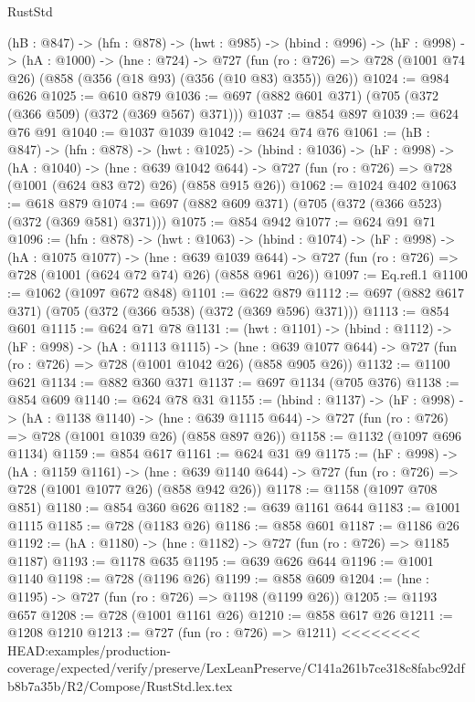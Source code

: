 \begin{lexlean}{RustStd}
\begin{coremodule}
{\begin{coremodule}
  (hB : @847) ->
  (hfn : @878) ->
  (hwt : @985) ->
  (hbind : @996) ->
  (hF : @998) ->
  (hA : @1000) ->
  (hne : @724) ->
  @727 (fun (ro : @726) => @728 (@1001 @74 @26) (@858 (@356 (@18 @93) (@356 (@10 @83) @355)) @26))
@1024 := @984 @626
@1025 := @610 @879
@1036 := @697 (@882 @601 @371) (@705 (@372 (@366 @509) (@372 (@369 @567) @371)))
@1037 := @854 @897
@1039 := @624 @76 @91
@1040 := @1037 @1039
@1042 := @624 @74 @76
@1061 := (hB : @847) ->
  (hfn : @878) ->
  (hwt : @1025) ->
  (hbind : @1036) ->
  (hF : @998) ->
  (hA : @1040) ->
  (hne : @639 @1042 @644) ->
  @727 (fun (ro : @726) => @728 (@1001 (@624 @83 @72) @26) (@858 @915 @26))
@1062 := @1024 @402
@1063 := @618 @879
@1074 := @697 (@882 @609 @371) (@705 (@372 (@366 @523) (@372 (@369 @581) @371)))
@1075 := @854 @942
@1077 := @624 @91 @71
@1096 := (hfn : @878) ->
  (hwt : @1063) ->
  (hbind : @1074) ->
  (hF : @998) ->
  (hA : @1075 @1077) ->
  (hne : @639 @1039 @644) ->
  @727 (fun (ro : @726) => @728 (@1001 (@624 @72 @74) @26) (@858 @961 @26))
@1097 := Eq.refl.{1}
@1100 := @1062 (@1097 @672 @848)
@1101 := @622 @879
@1112 := @697 (@882 @617 @371) (@705 (@372 (@366 @538) (@372 (@369 @596) @371)))
@1113 := @854 @601
@1115 := @624 @71 @78
@1131 := (hwt : @1101) ->
  (hbind : @1112) ->
  (hF : @998) ->
  (hA : @1113 @1115) ->
  (hne : @639 @1077 @644) -> @727 (fun (ro : @726) => @728 (@1001 @1042 @26) (@858 @905 @26))
@1132 := @1100 @621
@1134 := @882 @360 @371
@1137 := @697 @1134 (@705 @376)
@1138 := @854 @609
@1140 := @624 @78 @31
@1155 := (hbind : @1137) ->
  (hF : @998) ->
  (hA : @1138 @1140) ->
  (hne : @639 @1115 @644) -> @727 (fun (ro : @726) => @728 (@1001 @1039 @26) (@858 @897 @26))
@1158 := @1132 (@1097 @696 @1134)
@1159 := @854 @617
@1161 := @624 @31 @9
@1175 := (hF : @998) ->
  (hA : @1159 @1161) ->
  (hne : @639 @1140 @644) -> @727 (fun (ro : @726) => @728 (@1001 @1077 @26) (@858 @942 @26))
@1178 := @1158 (@1097 @708 @851)
@1180 := @854 @360 @626
@1182 := @639 @1161 @644
@1183 := @1001 @1115
@1185 := @728 (@1183 @26)
@1186 := @858 @601
@1187 := @1186 @26
@1192 := (hA : @1180) -> (hne : @1182) -> @727 (fun (ro : @726) => @1185 @1187)
@1193 := @1178 @635
@1195 := @639 @626 @644
@1196 := @1001 @1140
@1198 := @728 (@1196 @26)
@1199 := @858 @609
@1204 := (hne : @1195) -> @727 (fun (ro : @726) => @1198 (@1199 @26))
@1205 := @1193 @657
@1208 := @728 (@1001 @1161 @26)
@1210 := @858 @617 @26
@1211 := @1208 @1210
@1213 := @727 (fun (ro : @726) => @1211)
<<<<<<<< HEAD:examples/production-coverage/expected/verify/preserve/LexLeanPreserve/C141a261b7ce318c8fabc92dfb8b7a35b/R2/Compose/RustStd.lex.tex

\end{coremodule}}
\end{coremodule}
\end{lexlean}
